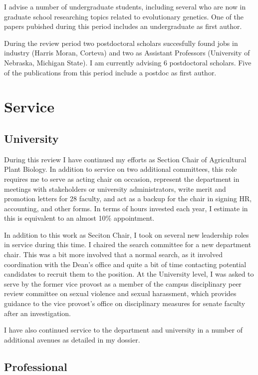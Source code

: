 \documentclass[letterpaper,10pt]{article}
\begin{document}
I advise a number of undergraduate students, including several who are now in graduate school researching topics related to evolutionary genetics.
One of the papers pubished during this period includes an undergraduate as first author.

During the review period two postdoctoral scholars succesfully found jobs in industry (Harris Moran, Corteva) and two as Assistant Professors (University of Nebraska, Michigan State). I am currently advising 6 postdoctoral scholars.  Five of the publications from this period include a postdoc as first author.

\section*{Service}

\subsection*{University}
During this review I have continued my efforts as Section Chair of Agricultural Plant Biology. In addition to service on two additional committees, this role requires me to serve as acting chair on occasion, represent the department in meetings with stakeholders or university administrators, write merit and promotion letters for 28 faculty, and act as a backup for the chair in signing HR, accounting, and other forms. In terms of hours invested each year, I estimate in this is equivalent to an almost 10\% appointment.

In addition to this work as Seciton Chair, I took on several new leadership roles in service during this time.  I chaired the search committee for a new department chair.  This was a bit more involved that a normal search, as it involved coordination with the Dean's office and quite a bit of time contacting potential candidates to recruit them to the position. At the University level, I was asked to serve by the former vice provost as a member of the campus disciplinary peer review committee on sexual violence and sexual harassment, which provides  guidance to the vice provost's office on disciplinary measures for senate faculty after an investigation.

I have also continued service to the department and university in a number of additional avenues as detailed in my dossier.

\subsection*{Professional}
\end{document}
